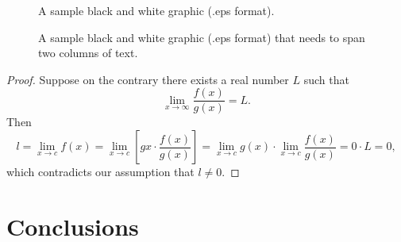 \documentclass{sig-alternate}
\begin{document}
\begin{figure}
\centering
{}
\caption{A sample black and white graphic (.eps format).}
\end{figure}



\begin{figure}
\centering
{}
\caption{A sample black and white graphic (.eps format)
that needs to span two columns of text.}
\end{figure}

\begin{proof}
Suppose on the contrary there exists a real number $L$ such that
\begin{displaymath}
\lim_{x\rightarrow\infty} \frac{f(x)}{g(x)} = L.
\end{displaymath}
Then
\begin{displaymath}
l=\lim_{x\rightarrow c} f(x)
= \lim_{x\rightarrow c}
\left[ g{x} \cdot \frac{f(x)}{g(x)} \right ]
= \lim_{x\rightarrow c} g(x) \cdot \lim_{x\rightarrow c}
\frac{f(x)}{g(x)} = 0\cdot L = 0,
\end{displaymath}
which contradicts our assumption that $l\neq 0$.
\end{proof}

\section{Conclusions}




\end{document}
